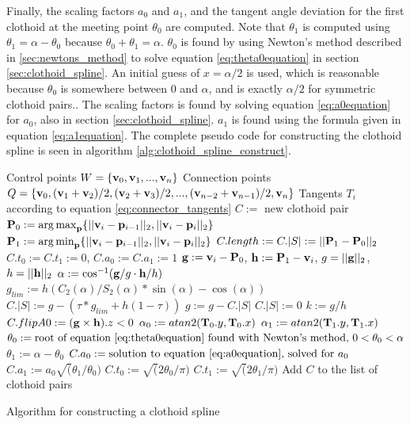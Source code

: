 Finally, the scaling factors $a_0$ and $a_1$, and the tangent angle deviation for the first clothoid at the meeting point $\theta_0$ are computed. Note that $\theta_1$ is computed using $\theta_1 = \alpha - \theta_0$ because $\theta_0 + \theta_1 = \alpha$\cite{clothoid}. $\theta_0$ is found by using Newton's method described in \ref{sec:newtons_method} to solve equation \ref{eq:theta0equation} in section \ref{sec:clothoid_spline}. An initial guess of $x=\alpha/2$ is used, which is reasonable because $\theta_0$ is somewhere between $0$ and $\alpha$, and is exactly $\alpha/2$ for symmetric clothoid pairs.\cite{clothoid}. The scaling factors is found by solving equation \ref{eq:a0equation} for $a_0$, also in section \ref{sec:clothoid_spline}. $a_1$ is found using the formula given in equation \ref{eq:a1equation}. The complete pseudo code for constructing the clothoid spline is seen in algorithm \ref{alg:clothoid_spline_construct}.

\begin{algorithm}[ht]
\centering
\begin{algorithmic}
\REQUIRE Control points $W=\{{\mathbf v}_0, {\mathbf v}_1, ..., {\mathbf v}_n\}$
\REQUIRE Connection points $Q=\{{\mathbf v}_0, ({\mathbf v}_1+{\mathbf v}_2)/2, ({\mathbf v}_2+{\mathbf v}_3)/2, ..., ({\mathbf v}_{n-2}+{\mathbf v}_{n-1})/2, {\mathbf v}_n\}$
\REQUIRE Tangents $T_i$ according to equation \ref{eq:connector_tangents}
\STATE $C := $ new clothoid pair
\STATE ${\mathbf P}_0 := \operatorname*{arg\,max}_{{\mathbf p}} \{||{\mathbf v}_i-{\mathbf p}_{i-1}||_2, ||{\mathbf v}_i-{\mathbf p}_i||_2\}$
\STATE ${\mathbf P}_1 := \operatorname*{arg\,min}_{{\mathbf p}} \{||{\mathbf v}_i-{\mathbf p}_{i-1}||_2, ||{\mathbf v}_i-{\mathbf p}_i||_2\}$
\STATE $C.length := C.|S| := ||{\mathbf P}_1 - {\mathbf P}_0||_2$
\STATE $C.t_0 := C.t_1 := 0$, $C.a_0 := C.a_1 := 1$
\ENDIF
\STATE ${\mathbf g} := {\mathbf v}_i-{\mathbf P}_0$, ${\mathbf h} := {\mathbf P}_1-{\mathbf v}_i$, $g = ||{\mathbf g}||_2$, $h = ||{\mathbf h}||_2$
\STATE $\alpha := \cos^{-1}({\mathbf g}/g \cdot {\mathbf h}/h)$
\STATE $g_{lim} := h(C_2(\alpha)/S_2(\alpha)*\sin(\alpha) - \cos(\alpha))$
    \STATE $C.|S| := g - (\tau*g_{lim} + h(1-\tau))$
    \STATE $g := g - C.|S|$
\ELSE
    \STATE $C.|S| := 0$
\ENDIF
\STATE $k := g/h$
\STATE $C.flipA0 := ({\mathbf g} \times {\mathbf h}).z < 0$
\STATE $\alpha_0 := atan2({\mathbf T}_0.y, {\mathbf T}_0.x)$
\STATE $\alpha_1 := atan2({\mathbf T}_1.y, {\mathbf T}_1.x)$
\STATE {}
\STATE $\theta_0 := \mbox{root of equation \ref{eq:theta0equation} found with Newton's method, $0 < \theta_0 < \alpha$}$
\STATE $\theta_1 := \alpha - \theta_0$
\STATE $C.a_0 := \mbox{solution to equation \ref{eq:a0equation}, solved for $a_0$}$
\STATE $C.a_1 := a_0\sqrt(\theta_1/\theta_0)$
\STATE $C.t_0 := \sqrt(2\theta_0/\pi)$
\STATE $C.t_1 := \sqrt(2\theta_1/\pi)$
\STATE Add $C$ to the list of clothoid pairs
\ENDFOR
\end{algorithmic}

\caption{Algorithm for constructing a clothoid spline}
\label{alg:clothoid_spline_construct}
\end{algorithm}

